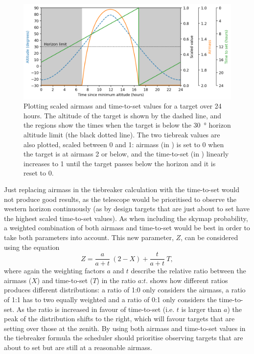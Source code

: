 \begin{colsection}
\begin{figure}[t]
    \begin{center}
        \includegraphics[width=\linewidth]{images/airmass-tts.png}
    \end{center}
    \caption[Plotting scaled airmass and time-to-set values for a target]{
        Plotting scaled airmass and time-to-set values for a target over 24 hours.
        The altitude of the target is shown by the  dashed line, and the  regions show the times when the target is below the \SI{30}{\degree} horizon altitude limit (the black dotted line).
        The two tiebreak values are also plotted, scaled between 0 and 1: airmass (in ) is set to 0 when the target is at airmass 2 or below, and the time-to-set (in ) linearly increases to 1 until the target passes below the horizon and it is reset to 0.
    }\label{fig:airmass_tts}
\end{figure}

Just replacing airmass in the tiebreaker calculation with the time-to-set would not produce good results, as the telescope would be prioritised to observe the western horizon continuously (as by design targets that are just about to set have the highest scaled time-to-set values). As when including the skymap probability, a weighted combination of both airmass and time-to-set would be best in order to take both parameters into account. This new parameter, $Z$, can be considered using the equation
%
\begin{equation}
    Z = \frac{a}{a+t}~(2-X) + \frac{t}{a+t}~T,
    \label{eq:at_ratio}
\end{equation}
%
where again the weighting factors $a$ and $t$ describe the relative ratio between the airmass ($X$) and time-to-set ($T$) in the ratio $a$:$t$.  shows how different ratios produces different distributions: a ratio of 1:0 only considers the airmass, a ratio of 1:1 has to two equally weighted and a ratio of 0:1 only considers the time-to-set. As the ratio is increased in favour of time-to-set (i.e. $t$ is larger than $a$) the peak of the distribution shifts to the right, which will favour targets that are setting over those at the zenith. By using both airmass and time-to-set values in the tiebreaker formula the scheduler should prioritise observing targets that are about to set but are still at a reasonable airmass.


\end{colsection}
